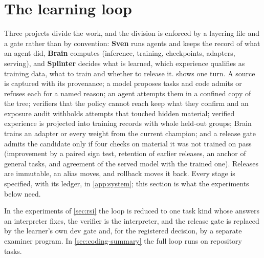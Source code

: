 
\section{The learning loop}\label{sec:loop}\label{app:loop}

Three projects divide the work, and the division is enforced by a layering file and a gate rather than
by convention: \textbf{Sven} runs agents and keeps the record of what an agent did, \textbf{Brain}
computes (inference, training, checkpoints, adapters, serving), and \textbf{Splinter} decides what is
learned, which experience qualifies as training data, what to train and whether to release
it.  shows one turn. A source is captured with its provenance; a model
proposes tasks and code admits or refuses each for a named reason; an agent attempts them in a confined
copy of the tree; verifiers that the policy cannot reach keep what they confirm and an exposure audit
withholds attempts that touched hidden material; verified experience is projected into training records
with whole held-out groups; Brain trains an adapter or every weight from the current champion; and a
release gate admits the candidate only if four checks on material it was not trained on pass
(improvement by a paired sign test, retention of earlier releases, an anchor of general tasks, and
agreement of the served model with the trained one). Releases are immutable, an alias moves, and
rollback moves it back. Every stage is specified, with its ledger, in
\cref{app:system}; this section is what the experiments below need.

In the experiments of \cref{sec:rsi} the loop is reduced to one task kind whose answers an interpreter
fixes, the verifier is the interpreter, and the release gate is replaced by the learner's own dev gate
and, for the registered decision, by a separate examiner program. In \cref{sec:coding-summary} the full
loop runs on repository tasks.

